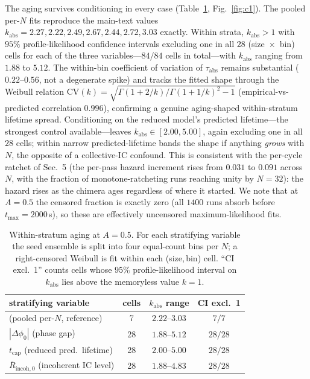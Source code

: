 \documentclass[11pt]{article}
\newcommand{\kabs}{k_{\mathrm{abs}}}
\newcommand{\tabs}{\tau_{\mathrm{abs}}}
\begin{document}
The aging survives conditioning in every case (Table~\ref{tab:c1}, Fig.~\ref{fig:c1}).
The pooled per-$N$ fits reproduce the main-text values $\kabs = 2.27,2.22,2.49,2.67,2.44,
2.72,3.03$ exactly. Within strata, $\kabs>1$ with $95\%$ profile-likelihood confidence
intervals excluding one in all $28$ (size~$\times$~bin) cells for each of the three
variables---$84/84$ cells in total---with $\kabs$ ranging from $1.88$ to $5.12$. The
within-bin coefficient of variation of $\tabs$ remains substantial ($0.22$--$0.56$, not a
degenerate spike) and tracks the fitted shape through the Weibull relation
$\mathrm{CV}(k)=\sqrt{\Gamma(1+2/k)/\Gamma(1+1/k)^2-1}$ (empirical-vs-predicted correlation
$0.996$), confirming a genuine aging-shaped within-stratum lifetime spread. Conditioning on
the reduced model's predicted lifetime---the strongest control available---leaves
$\kabs\in[2.00,5.00]$, again excluding one in all $28$ cells; within narrow predicted-lifetime
bands the shape if anything \emph{grows} with $N$, the opposite of a collective-IC confound.
This is consistent with the per-cycle ratchet of Sec.~5 (the per-pass hazard increment rises
from $0.031$ to $0.091$ across $N$, with the fraction of monotone-ratcheting runs reaching
unity by $N=32$): the hazard rises as the chimera ages regardless of where it started. We
note that at $A=0.5$ the censored fraction is exactly zero (all $1400$ runs absorb before
$t_{\max}=2000$\,s), so these are effectively uncensored maximum-likelihood fits.

\begin{table}[t]
\centering
\caption{Within-stratum aging at $A=0.5$. For each stratifying variable the seed
ensemble is split into four equal-count bins per $N$; a right-censored Weibull is fit
within each (size,\,bin) cell. ``CI excl.\ 1'' counts cells whose $95\%$
profile-likelihood interval on $\kabs$ lies above the memoryless value $k=1$.}
\label{tab:c1}
\begin{tabular}{lccc}
\toprule
stratifying variable & cells & $\kabs$ range & CI excl.\ 1 \\
\midrule
(pooled per-$N$, reference)              & 7  & $2.22$--$3.03$ & $7/7$ \\
$|\Delta\phi_0|$ (phase gap)             & 28 & $1.88$--$5.12$ & $28/28$ \\
$t_{\mathrm{cap}}$ (reduced pred.\ lifetime) & 28 & $2.00$--$5.00$ & $28/28$ \\
$\overline{R}_{\mathrm{incoh},0}$ (incoherent IC level) & 28 & $1.88$--$4.83$ & $28/28$ \\
\bottomrule
\end{tabular}
\end{table}
\end{document}
